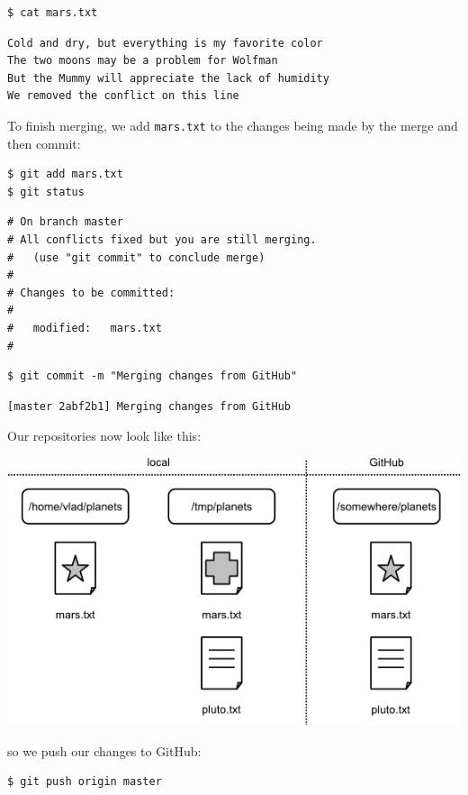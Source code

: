 \documentclass{book}
\begin{document}
\begin{verbatim}
$ cat mars.txt
\end{verbatim}

\begin{verbatim}
Cold and dry, but everything is my favorite color
The two moons may be a problem for Wolfman
But the Mummy will appreciate the lack of humidity
We removed the conflict on this line
\end{verbatim}

To finish merging, we add \texttt{mars.txt} to the changes being made by
the merge and then commit:

\begin{verbatim}
$ git add mars.txt
$ git status
\end{verbatim}

\begin{verbatim}
# On branch master
# All conflicts fixed but you are still merging.
#   (use "git commit" to conclude merge)
#
# Changes to be committed:
#
#   modified:   mars.txt
#
\end{verbatim}

\begin{verbatim}
$ git commit -m "Merging changes from GitHub"
\end{verbatim}

\begin{verbatim}
[master 2abf2b1] Merging changes from GitHub
\end{verbatim}

Our repositories now look like this:

\includegraphics{novice/git/img/git-after-second-conflicting-change.png}

so we push our changes to GitHub:

\begin{verbatim}
$ git push origin master
\end{verbatim}
\end{document}
